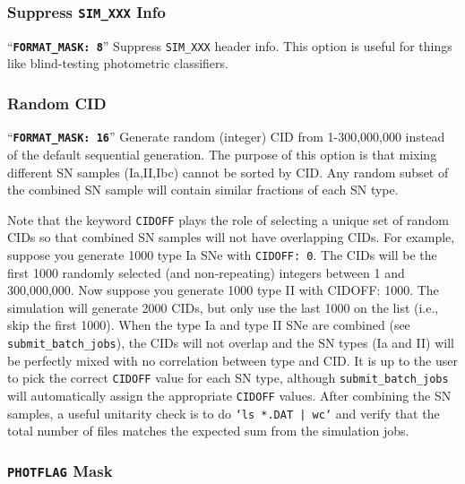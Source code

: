 \documentclass[12pt]{article}
\newcommand{\MXSIM}{300,000,000}
\begin{document}
   \subsubsection{Suppress {\tt SIM\_XXX} Info}
   \label{sss:blind_test}
``{\tt\bf FORMAT\_MASK:  8}'' 
Suppress {\tt SIM\_XXX} header info. This option is
useful for things like blind-testing photometric
classifiers.

   \subsubsection{Random CID}
   \label{sss:random_CID}
``{\tt\bf FORMAT\_MASK:  16}'' 
Generate random (integer) CID  from 1-{\MXSIM} instead
of the default sequential generation.
The purpose of this option is that mixing different SN samples 
(Ia,II,Ibc) cannot be sorted by CID. Any random subset of the
combined SN sample will contain similar fractions of each 
SN type.

Note that the keyword {\tt CIDOFF} plays the role of selecting
a unique set of random CIDs so that combined SN samples will 
not have overlapping CIDs. 
For example, suppose you generate 1000 type Ia SNe with {\tt CIDOFF: 0}. 
The CIDs will be the first 1000 randomly
selected (and non-repeating) integers between 1 and \MXSIM.
Now suppose you generate 1000 type II with {CIDOFF: 1000}.
The simulation will generate 2000 CIDs, but only use the last
1000 on the list (i.e., skip the first 1000).
When the type Ia and type II SNe are combined
(see {\tt submit\_batch\_jobs}), the CIDs will not overlap
and the SN types (Ia and II) will be perfectly mixed with no correlation
between type and CID. It is up to the user to pick the correct
{\tt CIDOFF} value for each SN type, although {\tt submit\_batch\_jobs}
will automatically assign the appropriate {\tt CIDOFF} values.
After combining the SN samples, a useful unitarity check is to do 
{\tt `ls *.DAT | wc`}
and verify that the total number of files matches the expected 
sum from the simulation jobs.


   \subsubsection{{\tt PHOTFLAG} Mask}
   \label{sss:PHOTFLAG}
\end{document}
